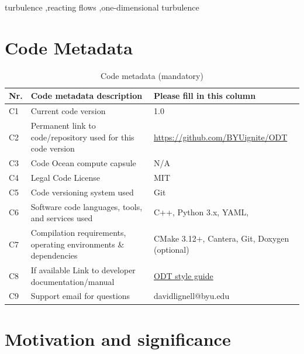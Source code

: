 \documentclass[preprint,12pt, a4paper]{elsarticle}
\begin{document}
\begin{frontmatter}
\begin{keyword}
turbulence \sep reacting flows \sep one-dimensional turbulence

\end{keyword}

\end{frontmatter}

\section*{Code Metadata}
\label{metadata}

\begin{table}[H]
\begin{tabular}{|l|p{6.5cm}|p{6.5cm}|}
\hline
\textbf{Nr.} & \textbf{Code metadata description} & \textbf{Please fill in this column} \\
\hline
C1 & Current code version & 1.0 \\
\hline
C2 & Permanent link to code/repository used for this code version & \href{https://github.com/BYUignite/ODT}{https://github.com/BYUignite/ODT} \\
\hline
C3 & Code Ocean compute capsule & N/A\\
\hline
C4 & Legal Code License   & MIT \\
\hline
C5 & Code versioning system used & Git \\
\hline
C6 & Software code languages, tools, and services used & C++, Python 3.x, YAML,  \\
\hline
C7 & Compilation requirements, operating environments \& dependencies & CMake 3.12+, Cantera, Git, Doxygen (optional) \\
\hline
C8 & If available Link to developer documentation/manual & \href{https://github.com/BYUignite/ODT}{ODT style guide} \\
\hline
C9 & Support email for questions & davidlignell@byu.edu \\
\hline
\end{tabular}
\caption{Code metadata (mandatory)}
\end{table}

\linenumbers

\section{Motivation and significance}
\label{sec:motivation}
\end{document}
